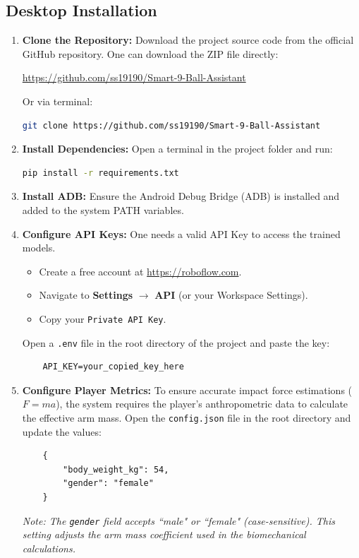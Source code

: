 \subsection{Desktop Installation}
\begin{enumerate}
    \item \textbf{Clone the Repository:} Download the project source code from the official GitHub repository. One can download the ZIP file directly:
    
    \begin{center}
        \url{https://github.com/ss19190/Smart-9-Ball-Assistant}
    \end{center}
    
    Or via terminal:
    \begin{lstlisting}[language=bash]
    git clone https://github.com/ss19190/Smart-9-Ball-Assistant
    \end{lstlisting}

    \item \textbf{Install Dependencies:} Open a terminal in the project folder and run:
    \begin{lstlisting}[language=bash]
    pip install -r requirements.txt
    \end{lstlisting}

    \item \textbf{Install ADB:} Ensure the Android Debug Bridge (ADB) is installed and added to the system PATH variables.

    \item \textbf{Configure API Keys:} One needs a valid API Key to access the trained models.
    \begin{itemize}
        \item Create a free account at \url{https://roboflow.com}.
        \item Navigate to \textbf{Settings} $\rightarrow$ \textbf{API} (or your Workspace Settings).
        \item Copy your \texttt{Private API Key}.
    \end{itemize}
    Open a \texttt{.env} file in the root directory of the project and paste the key:
    \begin{lstlisting}
    API_KEY=your_copied_key_here
    \end{lstlisting}

    \item \textbf{Configure Player Metrics:} To ensure accurate impact force estimations ($F=ma$), the system requires the player's anthropometric data to calculate the effective arm mass. Open the \texttt{config.json} file in the root directory and update the values:
    \begin{lstlisting}
    {
        "body_weight_kg": 54,
        "gender": "female"
    }
    \end{lstlisting}
    \textit{Note: The \texttt{gender} field accepts ``male" or ``female" (case-sensitive). This setting adjusts the arm mass coefficient used in the biomechanical calculations.}
\end{enumerate}

